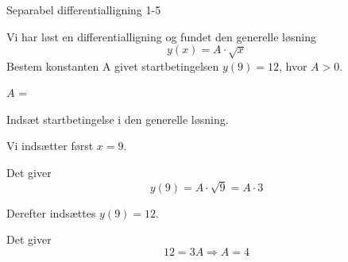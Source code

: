 \documentclass{article}
\begin{document}
\begin{exercise}{Separabel differentialligning 1-5}


Vi har løst en differentialligning og fundet den generelle løsning
\[
y(x) = A \cdot \sqrt{x}
\]
Bestem konstanten A givet startbetingelsen $y(9)=12$, hvor $A>0$.

$A$ = 

\hint

Indsæt startbetingelse i den generelle løsning.


\hint

Vi indsætter først $x=9$.

\hint

Det giver
\[
y(9)= A \cdot \sqrt{9} = A\cdot 3
\]

\hint

Derefter indsættes $y(9)=12$.

\hint

Det giver
\[
12 = 3A \Rightarrow A = 4
\]

\end{exercise}
\end{document}
